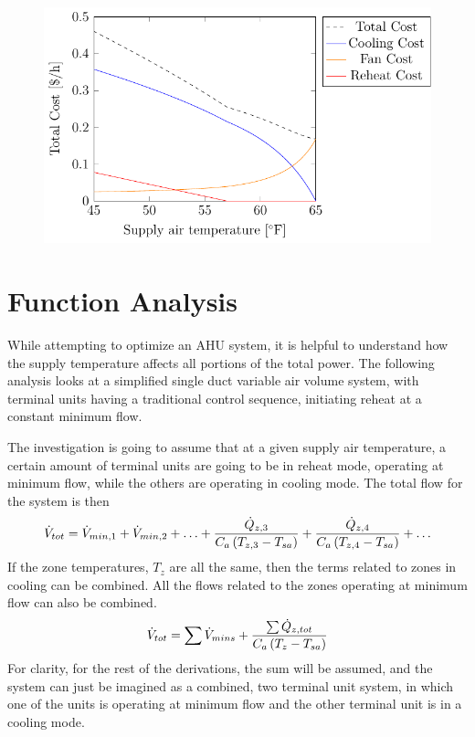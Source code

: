 \begin{figure}
\centering
\includegraphics{Plots/36-SimplifiedExampleCostLowerMAT/simplifiedExampleCostLowMAT.pdf}
\caption{}
\label{fig:simplifiedExampleCostLowerMAT}
\end{figure}


\section{Function Analysis}

While attempting to optimize an AHU system, it is helpful to understand
how the supply temperature affects all portions of the total power. The
following analysis looks at a simplified single duct variable air volume
system, with terminal units having a traditional control sequence,
initiating reheat at a constant minimum flow. 

The investigation is going to assume that at a given supply air
temperature, a certain amount of terminal units are going to be in
reheat mode, operating at minimum flow, while the others are operating
in cooling mode. The total flow for the system is then 
%
\begin{equation}
    \dot{V}_{tot} = \dot{V}_{min,1} + \dot{V}_{min,2} + \ldots +
    \frac{\dot{Q}_{z,3}}{C_{a} \left(T_{z,3} - T_{sa}\right) } +
    \frac{\dot{Q}_{z,4}}{C_{a} \left(T_{z,4} - T_{sa}\right) } +
    \ldots
\end{equation}
%
If the zone temperatures, \(T_{z}\) are all the same, then the terms
related to zones in cooling can be combined. All the flows related to
the zones operating at minimum flow can also be combined.
\begin{equation}
    \dot{V}_{tot} = \sum \dot{V}_{mins} + \frac{\sum \dot{Q}_{z,tot}}{C_{a} \left(T_{z} - T_{sa}\right) } 
\end{equation}
%
For clarity, for the rest of the derivations, the sum will be assumed,
and the system can just be imagined as a combined, two terminal unit
system, in which one of the units is operating at minimum flow and the
other terminal unit is in a cooling mode.

